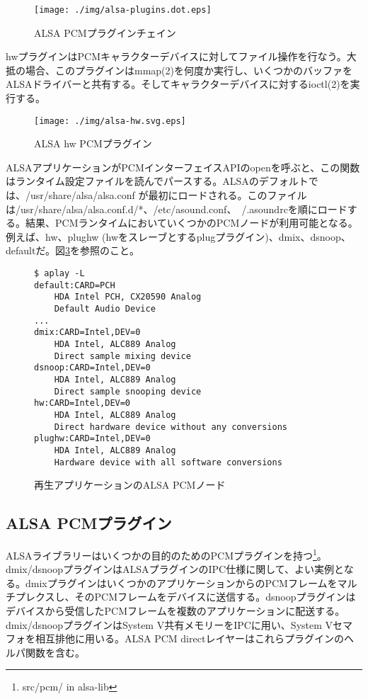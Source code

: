 \documentclass[onecolumn]{jarticle}
\begin{document}
\begin{figure}[htbp]
	\centering
	\texttt{[image: ./img/alsa-plugins.dot.eps]}
	\caption{{ALSA PCMプラグインチェイン}}
	\label{alsa_plugins}
\end{figure}

hwプラグインはPCMキャラクターデバイスに対してファイル操作を行なう。大抵の場合、このプラグインはmmap(2)を何度か実行し、いくつかのバッファをALSAドライバーと共有する。そしてキャラクターデバイスに対するioctl(2)を実行する。

\begin{figure}[htbp]
	\centering
	\texttt{[image: ./img/alsa-hw.svg.eps]}
	\caption{{ALSA hw PCMプラグイン}}
	\label{fig:alsa-hw-plugin}
\end{figure}

ALSAアプリケーションがPCMインターフェイスAPIのopenを呼ぶと、この関数はランタイム設定ファイルを読んでパースする。ALSAのデフォルトでは、/usr/share/alsa/alsa.conf が最初にロードされる。このファイルは/usr/share/alsa/alsa.conf.d/*、/etc/asound.conf、~/.asoundrcを順にロードする。結果、PCMランタイムにおいていくつかのPCMノードが利用可能となる。例えば、hw、plughw (hwをスレーブとするplugプラグイン)、dmix、dsnoop、defaultだ。図\ref{pcm-nodes-playback}を参照のこと。


\begin{figure}[htbp]
\small
\begin{verbatim}
$ aplay -L
default:CARD=PCH
    HDA Intel PCH, CX20590 Analog
    Default Audio Device
...
dmix:CARD=Intel,DEV=0
    HDA Intel, ALC889 Analog
    Direct sample mixing device
dsnoop:CARD=Intel,DEV=0
    HDA Intel, ALC889 Analog
    Direct sample snooping device
hw:CARD=Intel,DEV=0
    HDA Intel, ALC889 Analog
    Direct hardware device without any conversions
plughw:CARD=Intel,DEV=0
    HDA Intel, ALC889 Analog
    Hardware device with all software conversions
\end{verbatim}
\caption{再生アプリケーションのALSA PCMノード}
\label{pcm-nodes-playback}
\end{figure}

\subsection{ALSA PCMプラグイン}
ALSAライブラリーはいくつかの目的のためのPCMプラグインを持つ\footnote{src/pcm/ in alsa-lib}。dmix/dsnoopプラグインはALSAプラグインのIPC仕様に関して、よい実例となる。dmixプラグインはいくつかのアプリケーションからのPCMフレームをマルチプレクスし、そのPCMフレームをデバイスに送信する。dsnoopプラグインはデバイスから受信したPCMフレームを複数のアプリケーションに配送する。dmix/dsnoopプラグインはSystem V共有メモリーをIPCに用い、System Vセマフォを相互排他に用いる。ALSA PCM directレイヤーはこれらプラグインのヘルパ関数を含む。
\end{document}
